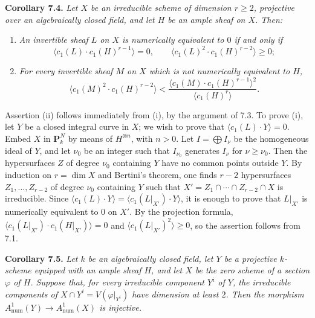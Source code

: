 \textbf{Corollary 7.4.} \emph{Let $X$ be an irreducible scheme of
dimension $r\geq2$, projective over an algebraically closed field, and
let $H$ be an ample sheaf on $X$. Then:}
\begin{enumerate}[label=(\roman*)]
\item \emph{An invertible sheaf $L$ on $X$ is numerically equivalent to
$0$ if and only if}
\[
  \langle c_1(L)\cdot c_1(H)^{r-1}\rangle=0,
  \qquad
  \langle c_1(L)^2\cdot c_1(H)^{r-2}\rangle\geq0;
\]
\item \emph{For every invertible sheaf $M$ on $X$ which is not
numerically equivalent to $H$,}
\[
  \langle c_1(M)^2\cdot c_1(H)^{r-2}\rangle
  <\frac{\langle c_1(M)\cdot c_1(H)^{r-1}\rangle^2}
  {\langle c_1(H)^r\rangle}.
\]
\end{enumerate}

Assertion (ii) follows immediately from (i), by the argument of 7.3. To
prove (i), let $Y$ be a closed integral curve in $X$; we wish to prove
that $\langle c_1(L)\cdot Y\rangle=0$. Embed $X$ in $\mathbf P^N_k$ by
means of $H^{\otimes n}$, with $n>0$. Let $I=\bigoplus I_\nu$ be the
homogeneous ideal of $Y$, and let $\nu_0$ be an integer such that
$I_{\nu_0}$ generates $I_\nu$ for $\nu\geq\nu_0$. Then the
hypersurfaces $Z$ of degree $\nu_0$ containing $Y$ have no common points
outside $Y$. By induction on $r=\dim X$ and Bertini's theorem, one finds
$r-2$ hypersurfaces $Z_1,\ldots,Z_{r-2}$ of degree $\nu_0$ containing
$Y$ such that $X'=Z_1\cap\cdots\cap Z_{r-2}\cap X$ is irreducible.
Since $\langle c_1(L)\cdot Y\rangle
=\langle c_1(L|_{X'})\cdot Y\rangle$, it is enough to prove that
$L|_{X'}$ is numerically equivalent to $0$ on $X'$. By the projection
formula, $\langle c_1(L|_{X'})\cdot c_1(H|_{X'})\rangle=0$ and
$\langle c_1(L|_{X'})^2\rangle\geq0$, so the assertion follows from 7.1.

\textbf{Corollary 7.5.} \emph{Let $k$ be an algebraically closed field,
let $Y$ be a projective $k$-scheme equipped with an ample sheaf $H$, and
let $X$ be the zero scheme of a section $\varphi$ of $H$. Suppose that,
for every irreducible component $Y^i$ of $Y$, the irreducible components
of $X\cap Y^i=V(\varphi|_{Y^i})$
have dimension at least $2$. Then the morphism
$A^1_{\mathrm{num}}(Y)\longrightarrow A^1_{\mathrm{num}}(X)$ is
injective.}

